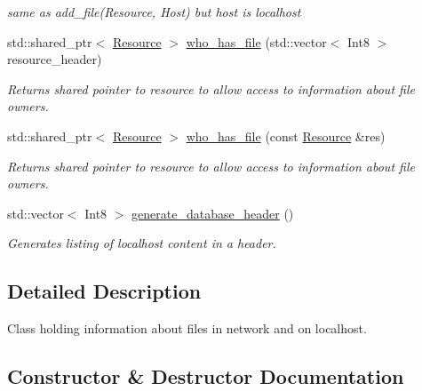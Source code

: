 \begin{DoxyCompactItemize}
\begin{DoxyCompactList}\small\item\em same as add\+\_\+file(\+Resource, Host) but host is localhost \end{DoxyCompactList}\item 
std\+::shared\+\_\+ptr$<$ \hyperlink{classsimpleP2P_1_1Resource}{Resource} $>$ \hyperlink{classsimpleP2P_1_1Resource__Database_a66fde779a931fbeb4f0e7865b63dce33}{who\+\_\+has\+\_\+file} (std\+::vector$<$ Int8 $>$ resource\+\_\+header)
\begin{DoxyCompactList}\small\item\em Returns shared pointer to resource to allow access to information about file owners. \end{DoxyCompactList}\item 
std\+::shared\+\_\+ptr$<$ \hyperlink{classsimpleP2P_1_1Resource}{Resource} $>$ \hyperlink{classsimpleP2P_1_1Resource__Database_a70aa9503db5700a6abdfdc9b029d71c1}{who\+\_\+has\+\_\+file} (const \hyperlink{classsimpleP2P_1_1Resource}{Resource} \&res)
\begin{DoxyCompactList}\small\item\em Returns shared pointer to resource to allow access to information about file owners. \end{DoxyCompactList}\item 
std\+::vector$<$ Int8 $>$ \hyperlink{classsimpleP2P_1_1Resource__Database_a3c226a6c72d0796cc9b86bda01502cbf}{generate\+\_\+database\+\_\+header} ()
\begin{DoxyCompactList}\small\item\em Generates listing of localhost content in a header. \end{DoxyCompactList}\end{DoxyCompactItemize}


\subsection{Detailed Description}
Class holding information about files in network and on localhost. 

\subsection{Constructor \& Destructor Documentation}
\mbox{\label{classsimpleP2P_1_1Resource__Database_a0158b1b1c4583d60534c2bea5dc437a3}} 
